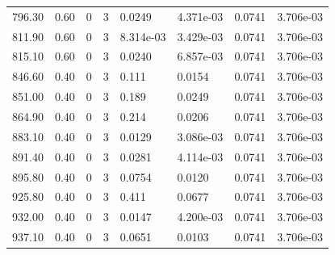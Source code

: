\documentclass[preview]{standalone}
\begin{document}
{{{\begin{tabular}{L{1.2cm}C{1.2cm} C{0.3cm}C{0.5cm} C{1.4cm}C{1.4cm} C{1.4cm}C{1.4cm}}
  796.30  &  0.60  & 0     &  3 &  0.0249  & 4.371e-03  & 0.0741 &  3.706e-03   \\ 
  811.90  &  0.60  & 0     &  3 &  8.314e-03  & 3.429e-03  & 0.0741 &  3.706e-03   \\ 
  815.10  &  0.60  & 0     &  3 &  0.0240  & 6.857e-03  & 0.0741 &  3.706e-03   \\ 
  846.60  &  0.40  & 0     &  3 &  0.111  & 0.0154  & 0.0741 &  3.706e-03   \\ 
  851.00  &  0.40  & 0     &  3 &  0.189  & 0.0249  & 0.0741 &  3.706e-03   \\ 
  864.90  &  0.40  & 0     &  3 &  0.214  & 0.0206  & 0.0741 &  3.706e-03   \\ 
  883.10  &  0.40  & 0     &  3 &  0.0129  & 3.086e-03  & 0.0741 &  3.706e-03   \\ 
  891.40  &  0.40  & 0     &  3 &  0.0281  & 4.114e-03  & 0.0741 &  3.706e-03   \\ 
  895.80  &  0.40  & 0     &  3 &  0.0754  & 0.0120  & 0.0741 &  3.706e-03   \\ 
  925.80  &  0.40  & 0     &  3 &  0.411  & 0.0677  & 0.0741 &  3.706e-03   \\ 
  932.00  &  0.40  & 0     &  3 &  0.0147  & 4.200e-03  & 0.0741 &  3.706e-03   \\ 
  937.10  &  0.40  & 0     &  3 &  0.0651  & 0.0103  & 0.0741 &  3.706e-03   \\ 
\hline 
\end{tabular} 

}}}
\end{document}
